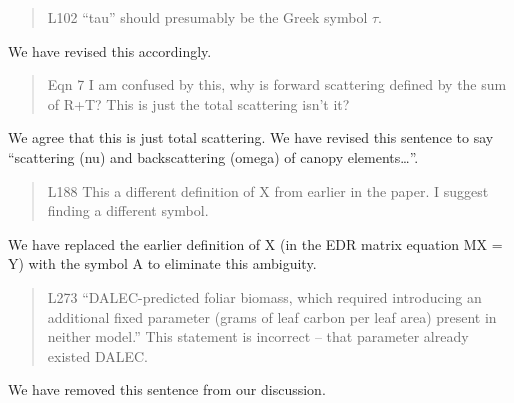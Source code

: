 \begin{quote}
L102 “tau” should presumably be the Greek symbol $\tau$.
\end{quote}

We have revised this accordingly.

\begin{quote}
Eqn 7 I am confused by this, why is forward scattering defined by the sum of R+T? This is just the total scattering isn’t it?
\end{quote}

We agree that this is just total scattering. We have revised this sentence to say “scattering (nu) and backscattering (omega) of canopy elements…”.

\begin{quote}
L188 This a different definition of X from earlier in the paper. I suggest finding a different symbol.
\end{quote}

We have replaced the earlier definition of X (in the EDR matrix equation MX = Y) with the symbol A to eliminate this ambiguity.

\begin{quote}
L273 “DALEC-predicted foliar biomass, which required introducing an additional fixed parameter (grams of leaf carbon per leaf area) present in neither model.” This statement is incorrect – that parameter already existed DALEC.
\end{quote}

We have removed this sentence from our discussion.
